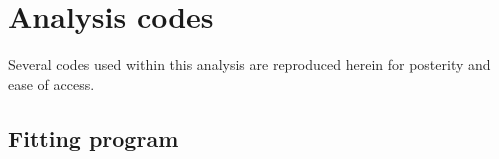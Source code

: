 %
%
%
%
%
%
%
%

%
%

\chapter{Analysis codes}
\label{appendix: codes}

Several codes used within this analysis are reproduced herein for posterity and ease of access.


\section{Fitting program}



%
% 
% 
